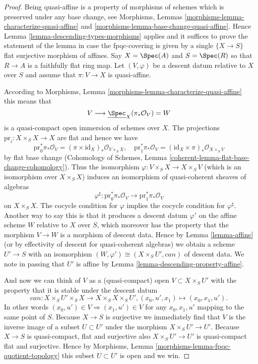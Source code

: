 \begin{proof}
Being quasi-affine is a property of morphisms of schemes
which is preserved under any base change, see
Morphisms, Lemmas \ref{morphisms-lemma-characterize-quasi-affine} and
\ref{morphisms-lemma-base-change-quasi-affine}.
Hence Lemma \ref{lemma-descending-types-morphisms} applies
and it suffices to prove the statement of the lemma
in case the fpqc-covering is given by a single
$\{X \to S\}$ flat surjective morphism of affines.
Say $X = \Spec(A)$ and $S = \Spec(R)$ so
that $R \to A$ is a faithfully flat ring map.
Let $(V, \varphi)$ be a descent datum relative to $X$ over $S$
and assume that $\pi : V \to X$ is quasi-affine.

\medskip\noindent
According to Morphisms, Lemma \ref{morphisms-lemma-characterize-quasi-affine}
this means that
$$
V \longrightarrow \underline{\Spec}_X(\pi_*\mathcal{O}_V) = W
$$
is a quasi-compact open immersion of schemes over $X$.
The projections $\text{pr}_i : X \times_S X \to X$ are flat
and hence we have
$$
\text{pr}_0^*\pi_*\mathcal{O}_V =
(\pi \times \text{id}_X)_*\mathcal{O}_{V \times_S X}, \quad
\text{pr}_1^*\pi_*\mathcal{O}_V =
(\text{id}_X \times \pi)_*\mathcal{O}_{X \times_S V}
$$
by flat base change
(Cohomology of Schemes, Lemma \ref{coherent-lemma-flat-base-change-cohomology}).
Thus the isomorphism $\varphi : V \times_S X \to X \times_S V$ (which
is an isomorphism over $X \times_S X$) induces an isomorphism
of quasi-coherent sheaves of algebras
$$
\varphi^\sharp :
\text{pr}_0^*\pi_*\mathcal{O}_V
\longrightarrow
\text{pr}_1^*\pi_*\mathcal{O}_V
$$
on $X \times_S X$.
The cocycle condition for $\varphi$ implies the cocycle condition
for $\varphi^\sharp$. Another way to say this is that it produces
a descent datum $\varphi'$ on the affine scheme $W$ relative to
$X$ over $S$, which moreover has the property that the morphism
$V \to W$ is a morphism of descent data.
Hence by Lemma \ref{lemma-affine}
(or by effectivity of descent for quasi-coherent
algebras) we obtain a scheme $U' \to S$ with an isomorphism
$(W, \varphi') \cong (X \times_S U', can)$ of descent data.
We note in passing that $U'$ is affine by
Lemma \ref{lemma-descending-property-affine}.

\medskip\noindent
And now we can think of $V$ as a (quasi-compact)
open $V \subset X \times_S U'$ with the property that
it is stable under the descent datum
$$
can : X \times_S U' \times_S X \to X \times_S X \times_S U',
(x_0, u', x_1) \mapsto (x_0, x_1, u').
$$
In other words $(x_0, u') \in V \Rightarrow (x_1, u') \in V$
for any $x_0, x_1, u'$ mapping to the same point of $S$.
Because $X \to S$ is surjective we immediately find that
$V$ is the inverse image of a subset $U \subset U'$ under
the morphism $X \times_S U' \to U'$.
Because $X \to S$ is quasi-compact, flat and surjective
also $X \times_S U' \to U'$ is quasi-compact flat and surjective.
Hence by Morphisms, Lemma \ref{morphisms-lemma-fpqc-quotient-topology}
this subset $U \subset U'$ is open and we win.
\end{proof}












